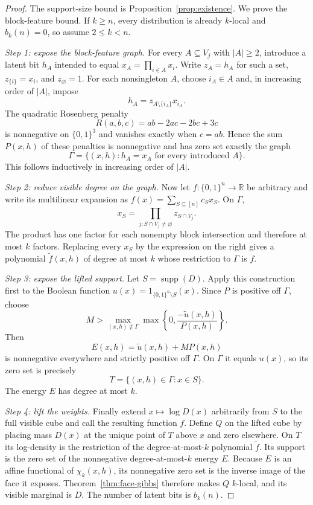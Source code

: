 \documentclass{article}
\newcommand{\supp}{\operatorname{supp}}
\newcommand{\bits}{\{0,1\}}
\begin{document}
\begin{proof}
The support-size bound is Proposition~\ref{prop:existence}.  We prove the
block-feature bound.  If $k\ge n$, every distribution is already $k$-local
and $b_k(n)=0$, so assume $2\le k<n$.

\emph{Step 1: expose the block-feature graph.}
For every $A\subseteq V_j$ with $|A|\ge2$, introduce a latent bit $h_A$ intended
to equal $x_A=\prod_{i\in A}x_i$.  Write $z_A=h_A$ for such a set,
$z_{\{i\}}=x_i$, and $z_\varnothing=1$.  For each nonsingleton $A$, choose
$i_A\in A$ and, in increasing order of $|A|$, impose
\[
  h_A=z_{A\setminus\{i_A\}}x_{i_A}.
\]
The quadratic Rosenberg penalty
\cite{rosenberg75}\cite[Observation~1]{boroshammer02}
\[
  R(a,b,c)=ab-2ac-2bc+3c
\]
is nonnegative on $\bits^3$ and vanishes exactly when $c=ab$.  Hence the sum
$P(x,h)$ of these penalties is nonnegative and has zero set exactly the graph
\[
  \Gamma=\{(x,h):h_A=x_A\text{ for every introduced }A\}.
\]
This follows inductively in increasing order of $|A|$.

\emph{Step 2: reduce visible degree on the graph.}
Now let $f:\bits^n\to\mathbb R$ be arbitrary and write its multilinear
expansion as $f(x)=\sum_{S\subseteq[n]}c_S x_S$.  On $\Gamma$,
\[
  x_S=\prod_{j:S\cap V_j\ne\varnothing}z_{S\cap V_j}.
\]
The product has one factor for each nonempty block intersection and therefore
at most $k$ factors.  Replacing every $x_S$ by the expression on the right
gives a polynomial $\widetilde f(x,h)$ of degree at most $k$ whose restriction
to $\Gamma$ is $f$.

\emph{Step 3: expose the lifted support.}
Let $S=\supp(D)$.  Apply this construction first to the Boolean function
$u(x)=1_{\bits^n\setminus S}(x)$.  Since $P$ is positive off $\Gamma$, choose
\[
  M>\max_{(x,h)\notin\Gamma}
  \max\left\{0,\frac{-\widetilde u(x,h)}{P(x,h)}\right\}.
\]
Then
\[
  E(x,h)=\widetilde u(x,h)+M P(x,h)
\]
is nonnegative everywhere and strictly positive off $\Gamma$.  On $\Gamma$
it equals $u(x)$, so its zero set is precisely
\[
  T=\{(x,h)\in\Gamma:x\in S\}.
\]
The energy $E$ has degree at most $k$.

\emph{Step 4: lift the weights.}
Finally extend $x\mapsto\log D(x)$ arbitrarily from $S$ to the full visible
cube and call the resulting function $f$.  Define $Q$ on the lifted cube by
placing mass $D(x)$ at the unique point of $T$ above $x$ and zero elsewhere.
On $T$ its log-density is the restriction of the degree-at-most-$k$ polynomial
$\widetilde f$.  Its support is the zero set of the nonnegative
degree-at-most-$k$ energy $E$.  Because $E$ is an affine functional of
$\chi_k(x,h)$, its nonnegative zero set is the inverse image of the face it
exposes.  Theorem~\ref{thm:face-gibbs} therefore makes $Q$ $k$-local, and its
visible marginal is $D$.  The number of latent bits is $b_k(n)$.
\end{proof}
\end{document}
